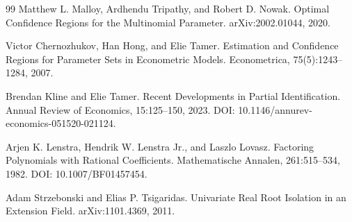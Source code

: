 \documentclass{article}
\begin{document}
\begin{thebibliography}{99}
   Matthew L. Malloy, Ardhendu Tripathy, and Robert D. Nowak. Optimal Confidence Regions for the Multinomial Parameter. arXiv:2002.01044, 2020.

   Victor Chernozhukov, Han Hong, and Elie Tamer. Estimation and Confidence Regions for Parameter Sets in Econometric Models. Econometrica, 75(5):1243--1284, 2007.

   Brendan Kline and Elie Tamer. Recent Developments in Partial Identification. Annual Review of Economics, 15:125--150, 2023. DOI: 10.1146/annurev-economics-051520-021124.

   Arjen K. Lenstra, Hendrik W. Lenstra Jr., and Laszlo Lovasz. Factoring Polynomials with Rational Coefficients. Mathematische Annalen, 261:515--534, 1982. DOI: 10.1007/BF01457454.

   Adam Strzebonski and Elias P. Tsigaridas. Univariate Real Root Isolation in an Extension Field. arXiv:1101.4369, 2011.

\end{thebibliography}
\end{document}
